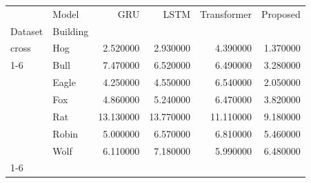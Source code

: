 \begin{tabular}{llrrrr}
\toprule
 & Model & GRU & LSTM & Transformer & Proposed \\
Dataset & Building &  &  &  &  \\
\midrule
cross & Hog & 2.520000 & 2.930000 & 4.390000 & 1.370000 \\
\cline{1-6}
\multirow[t]{6}{*}{holdout} & Bull & 7.470000 & 6.520000 & 6.490000 & 3.280000 \\
 & Eagle & 4.250000 & 4.550000 & 6.540000 & 2.050000 \\
 & Fox & 4.860000 & 5.240000 & 6.470000 & 3.820000 \\
 & Rat & 13.130000 & 13.770000 & 11.110000 & 9.180000 \\
 & Robin & 5.000000 & 6.570000 & 6.810000 & 5.460000 \\
 & Wolf & 6.110000 & 7.180000 & 5.990000 & 6.480000 \\
\cline{1-6}
\bottomrule
\end{tabular}
